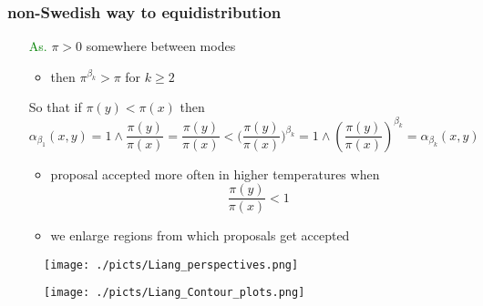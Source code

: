 
\begin{frame}
		\frametitle{ non-Swedish way to equidistribution }
	
	\begin{itemize}
			
		\item[\textcolor{green}{As.}] $ \pi > 0$ somewhere between modes 
		
		\begin{itemize}
			\item then $\pi^{\beta_k} > \pi$ for $k \geq 2$
		\end{itemize}
		
		\item[] So that if $\pi(y) < \pi(x)$ then  
 $$\alpha_{\beta_1}(x,y) = 1 \wedge \frac{\pi(y)}{\pi(x)} = \frac{\pi(y)}{\pi(x)} <  \Big(\frac{\pi(y)}{\pi(x)}\Big)^{\beta_k} = 1 \wedge (\frac{\pi(y)}{\pi(x)})^{\beta_k} = \alpha_{\beta_k}(x,y)$$

		\begin{itemize}
			\item proposal accepted more often in higher temperatures when  $$\frac{\pi(y)}{\pi(x)} < 1$$
			\item we enlarge regions from which proposals get accepted
		\end{itemize}

	\end{itemize}	

\end{frame}



\begin{frame}[plain]

	\begin{center}
		\begin{figure}\texttt{[image: ./picts/Liang\_perspectives.png]}\end{figure}	
	\end{center}	
		
\end{frame}


\begin{frame}[plain]

	\begin{center}
		\begin{figure}\texttt{[image: ./picts/Liang\_Contour\_plots.png]}\end{figure}	
	\end{center}	
		
\end{frame}

